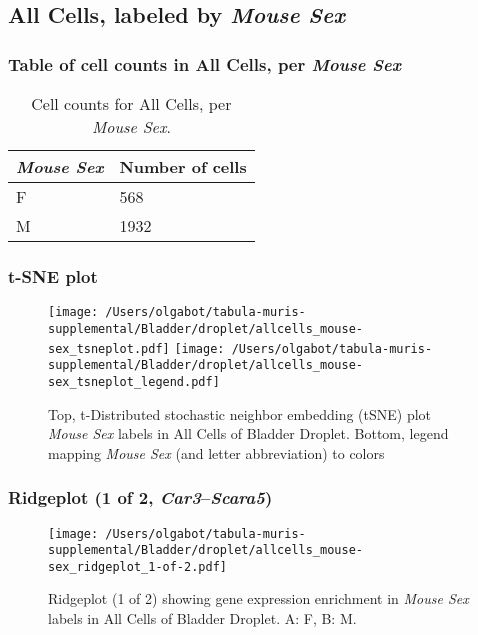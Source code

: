 \clearpage

\subsection{All Cells, labeled by \emph{Mouse Sex}}
\subsubsection{Table of cell counts in All Cells, per \emph{Mouse Sex}}\begin{table}[h]
\centering
\label{my-label}
\begin{tabular}{@{}ll@{}}
\toprule

\emph{Mouse Sex}& Number of cells \\ \midrule
F & 568 \\

M & 1932 \\
\bottomrule
\end{tabular}
\caption{Cell counts for All Cells, per \emph{Mouse Sex}.}
\end{table}

\clearpage
\subsubsection{t-SNE plot}
\begin{figure}[h]
\centering
\texttt{[image: /Users/olgabot/tabula-muris-supplemental/Bladder/droplet/allcells\_mouse-sex\_tsneplot.pdf]}
\texttt{[image: /Users/olgabot/tabula-muris-supplemental/Bladder/droplet/allcells\_mouse-sex\_tsneplot\_legend.pdf]}
\caption{Top, t-Distributed stochastic neighbor embedding (tSNE) plot  \emph{Mouse Sex} labels in All Cells of Bladder Droplet. Bottom, legend mapping \emph{Mouse Sex} (and letter abbreviation) to colors}
\end{figure}


\clearpage

\subsubsection{Ridgeplot (1 of 2, \emph{Car3}--\emph{Scara5})}
\begin{figure}[h]
\centering
\texttt{[image: /Users/olgabot/tabula-muris-supplemental/Bladder/droplet/allcells\_mouse-sex\_ridgeplot\_1-of-2.pdf]}

\caption{ Ridgeplot (1 of 2)  showing gene expression enrichment in \emph{Mouse Sex} labels in All Cells of Bladder Droplet. A: F, B: M.}
\end{figure}


